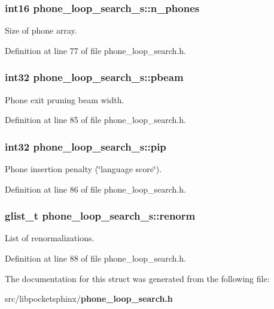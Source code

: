 \subsubsection[{n\-\_\-phones}]{\setlength{\rightskip}{0pt plus 5cm}int16 phone\-\_\-loop\-\_\-search\-\_\-s\-::n\-\_\-phones}\label{structphone__loop__search__s_a7844f45806d19d229504378da16bdc4c}


Size of phone array. 



Definition at line 77 of file phone\-\_\-loop\-\_\-search.\-h.

\subsubsection[{pbeam}]{\setlength{\rightskip}{0pt plus 5cm}int32 phone\-\_\-loop\-\_\-search\-\_\-s\-::pbeam}\label{structphone__loop__search__s_aaace8b677a536e41bb4616e6695b11d3}


Phone exit pruning beam width. 



Definition at line 85 of file phone\-\_\-loop\-\_\-search.\-h.

\subsubsection[{pip}]{\setlength{\rightskip}{0pt plus 5cm}int32 phone\-\_\-loop\-\_\-search\-\_\-s\-::pip}\label{structphone__loop__search__s_ac979bc57a659c7853eec1854dbcbfabe}


Phone insertion penalty (\char`\"{}language score\char`\"{}). 



Definition at line 86 of file phone\-\_\-loop\-\_\-search.\-h.

\subsubsection[{renorm}]{\setlength{\rightskip}{0pt plus 5cm}glist\-\_\-t phone\-\_\-loop\-\_\-search\-\_\-s\-::renorm}\label{structphone__loop__search__s_a273295fbe1a22ad3ddf7db8695a394ec}


List of renormalizations. 



Definition at line 88 of file phone\-\_\-loop\-\_\-search.\-h.



The documentation for this struct was generated from the following file\-:\begin{DoxyCompactItemize}
\item 
src/libpocketsphinx/{\bf phone\-\_\-loop\-\_\-search.\-h}\end{DoxyCompactItemize}
